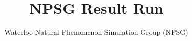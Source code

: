 \documentclass{article}
\begin{document}
\title{NPSG Result Run}
\author{Waterloo Natural Phenomenon Simulation Group (NPSG)}

\maketitle
\end{document}
